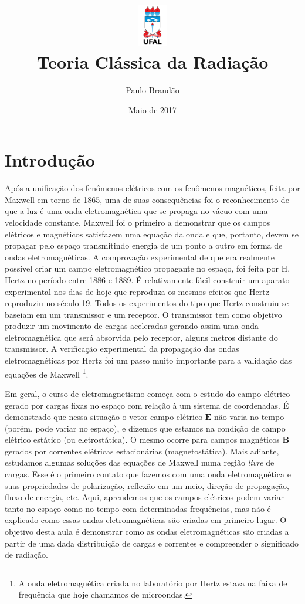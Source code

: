 \documentclass{article}
\title{\includegraphics[width=0.1\textwidth]{ufallogo.png} \\
\Huge{\color{astral}\textbf{Teoria Clássica da Radiação}}}
\author{Paulo Brandão}
\date{Maio de 2017}
\begin{document}
\maketitle

\section{Introdução}

Após a unificação dos fenômenos elétricos com os fenômenos magnéticos, feita por Maxwell em torno de 1865, uma de suas consequências foi o reconhecimento de que a luz é uma onda eletromagnética que se propaga no vácuo com uma velocidade constante. Maxwell foi o primeiro a demonstrar que os campos elétricos e magnéticos satisfazem uma equação da onda e que, portanto, devem se propagar pelo espaço transmitindo energia de um ponto a outro em forma de ondas eletromagnéticas. A comprovação experimental de que era realmente possível criar um campo eletromagnético propagante no espaço, foi feita por H. Hertz no período entre 1886 e 1889. É relativamente fácil construir um aparato experimental nos dias de hoje que reproduza os mesmos efeitos que Hertz reproduziu no século 19. Todos os experimentos do tipo que Hertz construiu se baseiam em um transmissor e um receptor. O transmissor tem como objetivo produzir um movimento de cargas aceleradas gerando assim uma onda eletromagnética que será absorvida pelo receptor, alguns metros distante do transmissor. A verificação experimental da propagação das ondas eletromagnéticas por Hertz foi um passo muito importante para a validação das equações de Maxwell \footnote{A onda eletromagnética criada no laboratório por Hertz estava na faixa de frequência que hoje chamamos de microondas.}.

Em geral, o curso de eletromagnetismo começa com o estudo do campo elétrico gerado por cargas fixas no espaço com relação à um sistema de coordenadas. É demonstrado que nessa situação o vetor campo elétrico $\mathbf{E}$ não varia no tempo (porém, pode variar no espaço), e dizemos que estamos na condição de campo elétrico estático (ou eletrostática). O mesmo ocorre para campos magnéticos $\mathbf{B}$ gerados por correntes elétricas estacionárias (magnetostática). Mais adiante, estudamos algumas soluções das equações de Maxwell numa região \textit{livre} de cargas. Esse é o primeiro contato que fazemos com uma onda eletromagnética e suas propriedades de polarização, reflexão em um meio, direção de propagação, fluxo de energia, etc. Aqui, aprendemos que os campos elétricos podem variar tanto no espaço como no tempo com determinadas frequências, mas não é explicado como essas ondas eletromagnéticas são criadas em primeiro lugar. O objetivo desta aula é demonstrar como as ondas eletromagnéticas são criadas a partir de uma dada distribuição de cargas e correntes e compreender o significado de radiação.  
\end{document}
